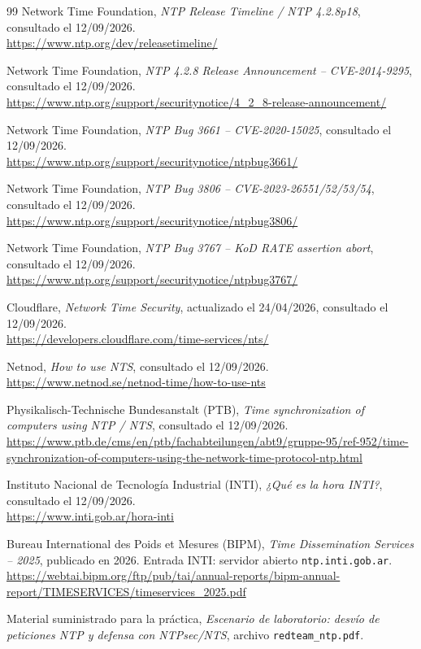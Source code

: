 \documentclass[11pt,a4paper]{article}
\begin{document}
\begin{thebibliography}{99}
Network Time Foundation, \emph{NTP Release Timeline / NTP 4.2.8p18}, consultado el 12/09/2026.\\
\url{https://www.ntp.org/dev/releasetimeline/}

Network Time Foundation, \emph{NTP 4.2.8 Release Announcement -- CVE-2014-9295}, consultado el 12/09/2026.\\
\url{https://www.ntp.org/support/securitynotice/4_2_8-release-announcement/}

Network Time Foundation, \emph{NTP Bug 3661 -- CVE-2020-15025}, consultado el 12/09/2026.\\
\url{https://www.ntp.org/support/securitynotice/ntpbug3661/}

Network Time Foundation, \emph{NTP Bug 3806 -- CVE-2023-26551/52/53/54}, consultado el 12/09/2026.\\
\url{https://www.ntp.org/support/securitynotice/ntpbug3806/}

Network Time Foundation, \emph{NTP Bug 3767 -- KoD RATE assertion abort}, consultado el 12/09/2026.\\
\url{https://www.ntp.org/support/securitynotice/ntpbug3767/}

Cloudflare, \emph{Network Time Security}, actualizado el 24/04/2026, consultado el 12/09/2026.\\
\url{https://developers.cloudflare.com/time-services/nts/}

Netnod, \emph{How to use NTS}, consultado el 12/09/2026.\\
\url{https://www.netnod.se/netnod-time/how-to-use-nts}

Physikalisch-Technische Bundesanstalt (PTB), \emph{Time synchronization of computers using NTP / NTS}, consultado el 12/09/2026.\\
\url{https://www.ptb.de/cms/en/ptb/fachabteilungen/abt9/gruppe-95/ref-952/time-synchronization-of-computers-using-the-network-time-protocol-ntp.html}

Instituto Nacional de Tecnología Industrial (INTI), \emph{¿Qué es la hora INTI?}, consultado el 12/09/2026.\\
\url{https://www.inti.gob.ar/hora-inti}

Bureau International des Poids et Mesures (BIPM), \emph{Time Dissemination Services -- 2025}, publicado en 2026. Entrada INTI: servidor abierto \texttt{ntp.inti.gob.ar}.\\
\url{https://webtai.bipm.org/ftp/pub/tai/annual-reports/bipm-annual-report/TIMESERVICES/timeservices_2025.pdf}

Material suministrado para la práctica, \emph{Escenario de laboratorio: desvío de peticiones NTP y defensa con NTPsec/NTS}, archivo \texttt{redteam\_ntp.pdf}.

\end{thebibliography}
\end{document}
